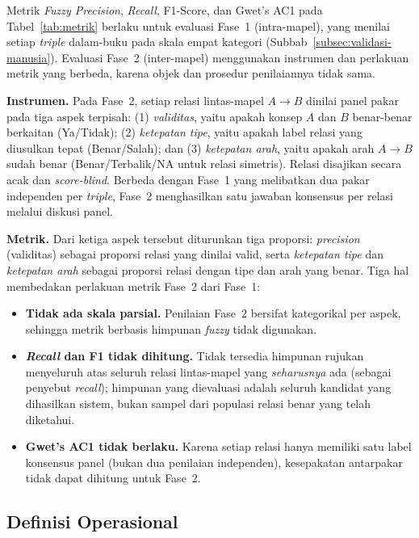 \documentclass[main]{subfiles}
\begin{document}
Metrik \textit{Fuzzy Precision}, \textit{Recall}, F1-Score, dan Gwet's AC1 pada
Tabel~\ref{tab:metrik} berlaku untuk evaluasi Fase~1 (intra-mapel), yang menilai
setiap \textit{triple} dalam-buku pada skala empat kategori
(Subbab~\ref{subsec:validasi-manusia}). Evaluasi Fase~2 (inter-mapel)
menggunakan instrumen dan perlakuan metrik yang berbeda, karena objek dan
prosedur penilaiannya tidak sama.

\textbf{Instrumen.} Pada Fase~2, setiap relasi lintas-mapel $A \to B$ dinilai
panel pakar pada tiga aspek terpisah: (1) \textit{validitas}, yaitu apakah konsep
$A$ dan $B$ benar-benar berkaitan (Ya/Tidak); (2) \textit{ketepatan tipe}, yaitu
apakah label relasi yang diusulkan tepat (Benar/Salah); dan (3)
\textit{ketepatan arah}, yaitu apakah arah $A \to B$ sudah benar
(Benar/Terbalik/NA untuk relasi simetris). Relasi disajikan secara acak dan
\textit{score-blind}. Berbeda dengan Fase~1 yang melibatkan dua pakar
independen per \textit{triple}, Fase~2 menghasilkan satu jawaban konsensus per
relasi melalui diskusi panel.

\textbf{Metrik.} Dari ketiga aspek tersebut diturunkan tiga proporsi:
\textit{precision} (validitas) sebagai proporsi relasi yang dinilai valid,
serta \textit{ketepatan tipe} dan \textit{ketepatan arah} sebagai proporsi
relasi dengan tipe dan arah yang benar. Tiga hal membedakan perlakuan metrik
Fase~2 dari Fase~1:

\begin{itemize}
  \item \textbf{Tidak ada skala parsial.} Penilaian Fase~2 bersifat
        kategorikal per aspek, sehingga metrik berbasis himpunan \textit{fuzzy}
        tidak digunakan.
  \item \textbf{\textit{Recall} dan F1 tidak dihitung.} Tidak tersedia himpunan
        rujukan menyeluruh atas seluruh relasi lintas-mapel yang
        \emph{seharusnya} ada (sebagai penyebut \textit{recall}); himpunan yang
        dievaluasi adalah seluruh kandidat yang dihasilkan sistem, bukan sampel
        dari populasi relasi benar yang telah diketahui.
  \item \textbf{Gwet's AC1 tidak berlaku.} Karena setiap relasi hanya memiliki
        satu label konsensus panel (bukan dua penilaian independen), kesepakatan
        antarpakar tidak dapat dihitung untuk Fase~2.
\end{itemize}

\subsection{Definisi Operasional}\label{subsec:definisi-operasional}
\end{document}
